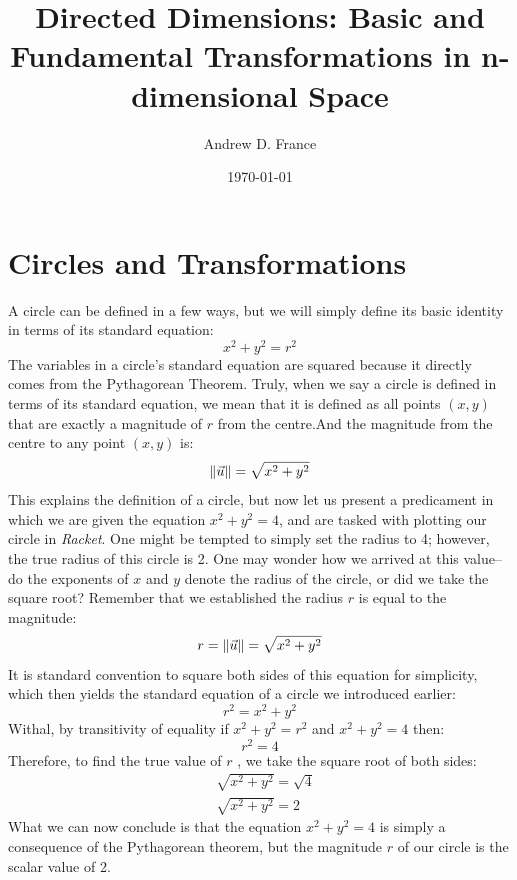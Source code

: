 \documentclass[12pt, letterpaper]{article}
\title{Directed Dimensions: Basic and Fundamental Transformations in n-dimensional Space}
\author{Andrew D. France}
\date{\today}
\newcommand{\iRac}{\textit{Racket}}
\newcommand{\Lr}{\(r\) }
\newcommand{\xy}{\((x,y)\) }
\begin{document}
	
	\maketitle
	\newpage
	
	\tableofcontents
	\newpage

	\section{Circles and Transformations}
	A circle can be defined in a few ways, but we will simply define its basic identity in terms of its standard equation:
	\begin{equation*}
		x^2 + y^2 = r^2
	\end{equation*}
	The variables in a circle's standard equation are squared because it directly comes from the Pythagorean Theorem. Truly, when we say a circle is defined in terms of its standard equation, we mean that it is defined as all points \xy that are exactly a magnitude of \Lr from the centre.\ftA And the magnitude from the centre to any point \xy is:
	\begin{equation*}
		\left\lVert\vec{u}\right\rVert=\sqrt{x^{2}+y^{2}}
	\end{equation*}
	This explains the definition of a circle, but now let us present a predicament in which we are given the equation \(x^2 + y^2 = 4\), and are tasked with plotting our circle in \iRac. One might be tempted to simply set the radius to 4; however, the true radius of this circle is 2. One may wonder how we arrived at this value--do the exponents of \(x\) and \(y\) denote the radius of the circle, or did we take the square root? Remember that we established the radius \Lr is equal to the magnitude:
	\begin{equation*}
		r = \left\lVert\vec{u}\right\rVert = \sqrt{x^{2}+y^{2}}
	\end{equation*}
	It is standard convention to square both sides of this equation for simplicity, which then yields the standard equation of a circle we introduced earlier:
	\begin{equation*}
		r^2 = x^{2}+y^{2}
	\end{equation*}
	Withal, by transitivity of equality if \(x^2 + y^2 = r^2\) and \(x^2 + y^2 = 4\) then:\ftC
	\begin{equation*}
		r^2 = 4
	\end{equation*}
	Therefore, to find the true value of \Lr, we take the square root of both sides:
	\begin{equation*}
		\begin{split}
			&\sqrt{x^2 + y^2} = \sqrt{4} \\
			&\sqrt{x^{2}+y^{2}}=2
		\end{split}
	\end{equation*}
	What we can now conclude is that the equation \(x^{2}+y^{2}=4\) is simply a consequence of the Pythagorean theorem, but the magnitude \Lr of our circle is the scalar value of 2.
	
\end{document}
